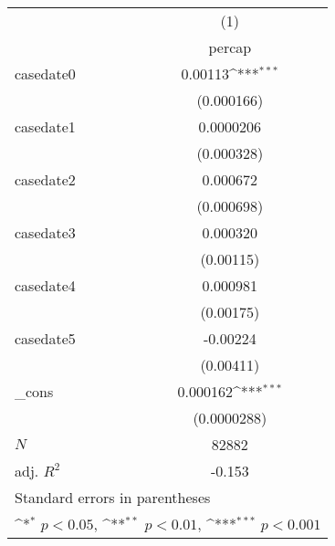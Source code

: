 {
\def\sym#1{\ifmmode^{#1}\else\(^{#1}\)\fi}
\begin{tabular}{l*{1}{c}}
\hline\hline
            &\multicolumn{1}{c}{(1)}\\
            &\multicolumn{1}{c}{percap}\\
\hline
casedate0   &     0.00113\sym{***}\\
            &  (0.000166)         \\
[1em]
casedate1   &   0.0000206         \\
            &  (0.000328)         \\
[1em]
casedate2   &    0.000672         \\
            &  (0.000698)         \\
[1em]
casedate3   &    0.000320         \\
            &   (0.00115)         \\
[1em]
casedate4   &    0.000981         \\
            &   (0.00175)         \\
[1em]
casedate5   &    -0.00224         \\
            &   (0.00411)         \\
[1em]
\_cons      &    0.000162\sym{***}\\
            & (0.0000288)         \\
\hline
\(N\)       &       82882         \\
adj. \(R^{2}\)&      -0.153         \\
\hline\hline
\multicolumn{2}{l}{\footnotesize Standard errors in parentheses}\\
\multicolumn{2}{l}{\footnotesize \sym{*} \(p<0.05\), \sym{**} \(p<0.01\), \sym{***} \(p<0.001\)}\\
\end{tabular}
}
